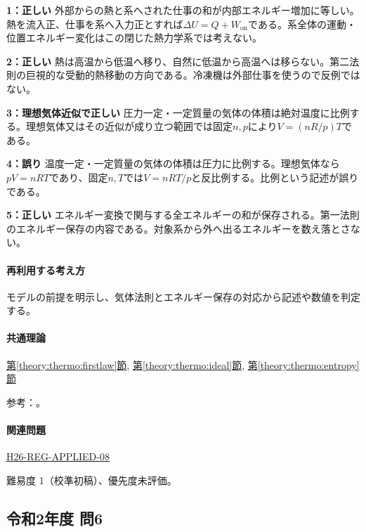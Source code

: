 \noindent\textbf{1：正しい} 外部からの熱と系へされた仕事の和が内部エネルギー増加に等しい。熱を流入正、仕事を系へ入力正とすれば\(\Delta U=Q+W_{\mathrm{on}}\)である。系全体の運動・位置エネルギー変化はこの閉じた熱力学系では考えない。\par

\noindent\textbf{2：正しい} 熱は高温から低温へ移り、自然に低温から高温へは移らない。第二法則の巨視的な受動的熱移動の方向である。冷凍機は外部仕事を使うので反例ではない。\par

\noindent\textbf{3：理想気体近似で正しい} 圧力一定・一定質量の気体の体積は絶対温度に比例する。理想気体又はその近似が成り立つ範囲では固定\(n,p\)により\(V=(nR/p)T\)である。\par

\noindent\textbf{4：誤り} 温度一定・一定質量の気体の体積は圧力に比例する。理想気体なら\(pV=nRT\)であり、固定\(n,T\)では\(V=nRT/p\)と反比例する。比例という記述が誤りである。\par

\noindent\textbf{5：正しい} エネルギー変換で関与する全エネルギーの和が保存される。第一法則のエネルギー保存の内容である。対象系から外へ出るエネルギーを数え落とさない。\par

\paragraph{再利用する考え方} モデルの前提を明示し、気体法則とエネルギー保存の対応から記述や数値を判定する。

\paragraph{共通理論} \hyperref[theory:thermo:firstlaw]{第\ref*{theory:thermo:firstlaw}節}, \hyperref[theory:thermo:ideal]{第\ref*{theory:thermo:ideal}節}, \hyperref[theory:thermo:entropy]{第\ref*{theory:thermo:entropy}節}

\par 参考：\cite{mit_thermo_firstlaw2008}。

\paragraph{関連問題} \hyperref[q:h26-reg-applied-08]{H26-REG-APPLIED-08}

\par 難易度 1（校準初稿）、優先度未評価。

\subsection{令和2年度 問6}
\label{q:r02-reg-applied-06}

